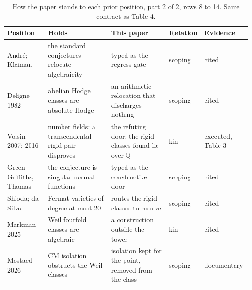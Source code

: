 \documentclass[10pt,twocolumn]{article}
\begin{document}
\begin{table}[tp]
\centering
\footnotesize
\setlength{\tabcolsep}{4pt}
\caption{How the paper stands to each prior position, part 2 of 2, rows 8 to 14. Same contract as Table 4.}
\begin{tabular}{@{}>{\raggedright\arraybackslash\hspace{0pt}}p{}>{\raggedright\arraybackslash\hspace{0pt}}p{}>{\raggedright\arraybackslash\hspace{0pt}}p{}>{\raggedright\arraybackslash\hspace{0pt}}p{}>{\raggedright\arraybackslash\hspace{0pt}}p{}@{}}
\toprule
Position & Holds & This paper & Relation & Evidence \\
\midrule
André; Kleiman \cite{andre1996,kleiman1968} & the standard conjectures relocate algebraicity & typed as the regress gate & scoping & cited \\
Deligne 1982 \cite{deligne1982} & abelian Hodge classes are absolute Hodge & an arithmetic relocation that discharges nothing & scoping & cited \\
Voisin 2007; 2016 \cite{voisin2007,voisin2016} & number fields; a transcendental rigid pair disproves & the refuting door; the rigid classes found lie over $\mathbb{Q}$ & kin & executed, Table 3 \\
Green-\hspace{0pt}Griffiths; Thomas \cite{gg2007,thomas2005} & the conjecture is singular normal functions & typed as the constructive door & scoping & cited \\
Shioda; da Silva \cite{shioda1979,dasilva2021} & Fermat varieties of degree at most 20 & routes the rigid classes to resolve & scoping & cited \\
Markman 2025 \cite{markman2025b} & Weil fourfold classes are algebraic & a construction outside the tower & kin & cited \\
Mostaed 2026 \cite{mostaed2026} & CM isolation obstructs the Weil classes & isolation kept for the point, removed from the class & scoping & documentary \\
\bottomrule
\end{tabular}
\end{table}
\end{document}
